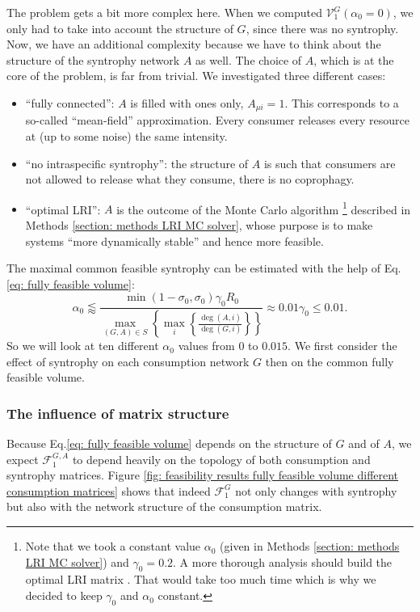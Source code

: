 \documentclass[12pt, titlepage]{report}
\begin{document}
The problem gets a bit more complex here. When we computed $\mathcal{V}^G_1(\alpha_0=0)$, we only had to take into account the structure of $G$, since there was no syntrophy. Now, we have an additional complexity because we have to think about the structure of the syntrophy network $A$ as well. The choice of $A$, which is at the core of the problem, is far from trivial. We investigated three different cases:
\begin{itemize}
  \item ``fully connected'': $A$ is filled with ones only, $A_{\mu i}=1$. This corresponds to a so-called ``mean-field'' approximation. Every consumer releases every resource at (up to some noise) the same intensity.
  \item ``no intraspecific syntrophy'': the structure of $A$ is such that consumers are not allowed to release what they consume, \ie there is no coprophagy.
  \item ``optimal LRI'': $A$ is the outcome of the Monte Carlo algorithm \footnote{Note that we took a constant value $\alpha_0$ (given in Methods \ref{section: methods LRI MC solver}) and $\gamma_0=0.2$. A more thorough analysis should build the optimal LRI matrix . That would take too much time which is why we decided to keep $\gamma_0$ and $\alpha_0$ constant.}
 described in Methods \ref{section: methods LRI MC solver}, whose purpose is to make systems ``more dynamically stable'' and hence more feasible.
  \end{itemize}
  The maximal common feasible syntrophy can be estimated with the help of Eq.\eqref{eq: fully feasible volume}:
  \begin{equation}
  \alpha_0 \lessapprox \frac{\min(1-\sigma_0, \sigma_0)\gamma_0 R_0}{\max_{(G,A)\in S}\left\{\max_i\left\{\frac{\deg(A,i)}{\deg(G,i)}\right\}\right\}} \approx 0.01 \gamma_0 \leq 0.01. \label{eq : results feasibility largest alpha0}
  \end{equation}
  So we will look at ten different $\alpha_0$ values from $0$ to $0.015$. We first consider the effect of syntrophy on each consumption network $G$ then on the common fully feasible volume.

  \subsubsection{The influence of matrix structure}
  Because Eq.\eqref{eq: fully feasible volume} depends on the structure of $G$ and of $A$, we expect $\mathcal{F}^{G,A}_1$ to depend heavily on the topology of both consumption and syntrophy matrices. Figure \ref{fig: feasibility results fully feasible volume different consumption matrices} shows that indeed $\mathcal{F}^G_1$ not only changes with syntrophy but also with the network structure of the consumption matrix.
\end{document}
